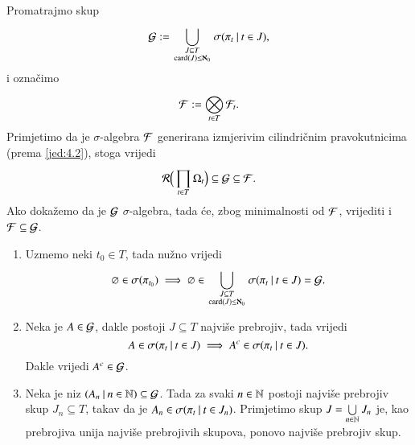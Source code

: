 \begin{rj}
    Promatrajmo skup
    \begin{equation*}
        \mathcal{G} := \bigcup\limits_{
            \begin{smallmatrix}
                J \subseteq T\\
                \mathrm{card}({J}) \leq \aleph_0
            \end{smallmatrix}
        }^{} \sigma({\pi_t} \: | \: {t \in J}),
    \end{equation*}
    i ozna\v cimo
    \begin{equation*}
        \mathcal{F} := \bigotimes\limits_{t \in T}^{} \mathcal{F}_t.
    \end{equation*}
    Primjetimo da je $\sigma$-algebra $\mathcal{F}$ generirana izmjerivim cilindri\v cnim pravokutnicima (prema \eqref{jed:4.2}), stoga vrijedi
    \begin{equation*}
        \mathcal{R} \Big( \prod\limits_{t \in T}^{} \Omega_t \Big) \subseteq \mathcal{G} \subseteq \mathcal{F}.
    \end{equation*}
    Ako doka\v zemo da je $\mathcal{G}$ $\sigma$-algebra, tada \' ce, zbog minimalnosti od $\mathcal{F}$, vrijediti i $\mathcal{F} \subseteq \mathcal{G}$.
    \begin{enumerate}[label=(\roman*)]
        \item Uzmemo neki $t_0 \in T$, tada nu\v zno vrijedi
        \begin{equation*}
            \varnothing \in \sigma({\pi_{t_0}}) \implies \varnothing \in \bigcup\limits_{
                \begin{smallmatrix}
                    J \subseteq T\\
                    \mathrm{card}({J}) \leq \aleph_0
                \end{smallmatrix}
            }^{} \sigma({\pi_t} \: | \: {t \in J}) = \mathcal{G}.
        \end{equation*}
        \item Neka je $A \in \mathcal{G}$, dakle postoji $J \subseteq T$ najvi\v se prebrojiv, tada vrijedi
        \begin{equation*}
            A \in \sigma({\pi_t} \: | \: {t \in J}) \implies A^c \in \sigma({\pi_t} \: | \: {t \in J}).
        \end{equation*}
        Dakle vrijedi $A^c \in \mathcal{G}$.
        \item Neka je niz $({A_n} \: | \: {n \in \mathbb{N}}) \subseteq \mathcal{G}$.
        Tada za svaki $n \in \mathbb{N}$ postoji najvi\v se prebrojiv skup $J_n \subseteq T$, takav da je $A_n \in \sigma({\pi_t} \: | \: {t \in J_n})$.
        Primjetimo skup $J = \bigcup\limits_{n \in \mathbb{N}}^{} J_n$ je, kao prebrojiva unija najvi\v se prebrojivih skupova, ponovo najvi\v se prebrojiv skup.

\end{enumerate}
\end{rj}
